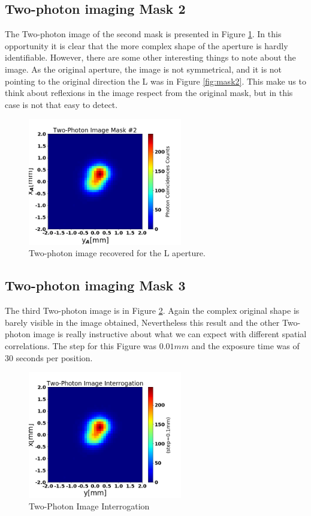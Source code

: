 \subsection{Two-photon imaging Mask 2}
The Two-photon image of the second mask is presented in Figure \ref{fig:twoPhotonL}. 
In this opportunity it is clear that the more complex shape of the aperture is hardly
identifiable. However, there are some other interesting things to note about the image.
As the original aperture, the image is not symmetrical, and it is not pointing to the
original direction the L was in Figure \ref{fig:mask2}. This make us to think 
about reflexions in the image respect from the original mask, but in this case is 
not that easy to detect.
\begin{figure}[h!]
\centering
\includegraphics[width=0.6\textwidth]{Figures/twoPhoL.png} 
\caption{Two-photon image recovered for the L aperture.}
\label{fig:twoPhotonL}
\end{figure}



\subsection{Two-photon imaging Mask 3}
The third Two-photon image is in Figure \ref{fig:twoPhotonInte}. Again the complex original
shape is barely visible in the image obtained, Nevertheless this result and the other Two-photon image is
really instructive about what we can expect with different spatial correlations. The step for this Figure was $0.01mm$ and the exposure time 
was of 30 seconds per position. 
\begin{figure}[h!]
\centering
\includegraphics[width=0.6\textwidth]{Figures/twoPhotonInte.png} 
\caption{Two-Photon Image Interrogation}
\label{fig:twoPhotonInte}
\end{figure}

